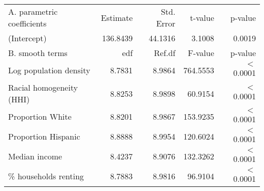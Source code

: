 \begin{table}[ht]
\centering
\begin{tabular}{lrrrr}
   \hline
A. parametric coefficients & Estimate & Std. Error & t-value & p-value \\ 
  (Intercept) & 136.8439 & 44.1316 & 3.1008 & 0.0019 \\ 
   \hline
B. smooth terms & edf & Ref.df & F-value & p-value \\ 
  Log population density & 8.7831 & 8.9864 & 764.5553 & $<$ 0.0001 \\ 
  Racial homogeneity (HHI) & 8.8253 & 8.9898 & 60.9154 & $<$ 0.0001 \\ 
  Proportion White & 8.8201 & 8.9867 & 153.9235 & $<$ 0.0001 \\ 
  Proportion Hispanic & 8.8888 & 8.9954 & 120.6024 & $<$ 0.0001 \\ 
  Median income & 8.4237 & 8.9076 & 132.3262 & $<$ 0.0001 \\ 
  \% households renting & 8.7883 & 8.9816 & 96.9104 & $<$ 0.0001 \\ 
   \hline
\end{tabular}
\caption{ } 
\label{Demographic GAM}
\end{table}
